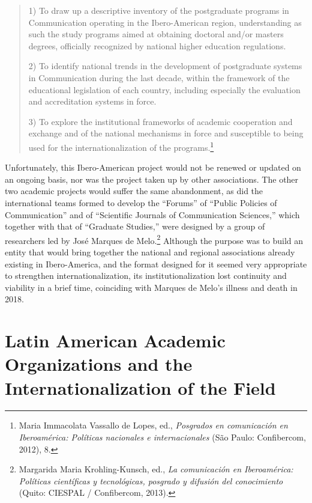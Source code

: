 \documentclass{tufte-handout}
\begin{document}
\begin{quote}
1) To draw up a descriptive inventory of the postgraduate programs in
Communication operating in the Ibero-American region, understanding as
such the study programs aimed at obtaining doctoral and/or
master\textquotesingle s degrees, officially recognized by national
higher education regulations.

2) To identify national trends in the development of postgraduate
systems in Communication during the last decade, within the framework of
the educational legislation of each country, including especially the
evaluation and accreditation systems in force.

3) To explore the institutional frameworks of academic cooperation and
exchange and of the national mechanisms in force and susceptible to
being used for the internationalization of the programs.\footnote{Maria
  Immacolata Vassallo de Lopes, ed., \emph{Posgrados en comunicación en
  Iberoamérica: Políticas nacionales e internacionales} (São Paulo:
  Confibercom, 2012), 8.}
\end{quote}

Unfortunately, this Ibero-American project would not be renewed or
updated on an ongoing basis, nor was the project taken up by other
associations. The other two academic projects would suffer the same
abandonment, as did the international teams formed to develop the
``Forums'' of ``Public Policies of Communication'' and of ``Scientific
Journals of Communication Sciences,'' which together with that of
``Graduate Studies,'' were designed by a group of researchers led by
José Marques de Melo.\footnote{Margarida Maria Krohling-Kunsch, ed.,
  \emph{La comunicación en Iberoamérica: Políticas científicas y
  tecnológicas, posgrado y difusión del conocimiento} (Quito: CIESPAL /
  Confibercom, 2013).} Although the purpose was to build an entity that
would bring together the national and regional associations already
existing in Ibero-America, and the format designed for it seemed very
appropriate to strengthen internationalization, its institutionalization
lost continuity and viability in a brief time, coinciding with Marques
de Melo's illness and death in 2018.

\hypertarget{latin-american-academic-organizations-and-the-internationalization-of-the-field}{%
\section{Latin American Academic Organizations and the\\\noindent
Internationalization of the
Field}\label{latin-american-academic-organizations-and-the-internationalization-of-the-field}}
\end{document}
